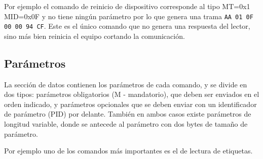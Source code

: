 \documentclass[fleqn,10pt]{SelfArx} %
\begin{document}
Por ejemplo el comando de reinicio de dispositivo corresponde al tipo MT=0x1 MID=0x0F y no tiene ningún parámetro por lo que genera una trama \lstinline{AA 01 0F 00 00 94 CF}. Este es el único comando que no genera una respuesta del lector, sino más bien reinicia el equipo cortando la comunicación.

\subsection*{Parámetros}

La sección de datos contienen los parámetros de cada comando, y se divide en dos tipos: parámetros obligatorios (M - mandatorio), que deben ser enviados en el orden indicado, y parámetros opcionales que se deben enviar con un identificador de parámetro (PID) por delante. También en ambos casos existe parámetros de longitud variable, donde se antecede al parámetro con dos bytes de tamaño de parámetro. 

Por ejemplo uno de los comandos más importantes es el de lectura de etiquetas.
\end{document}
